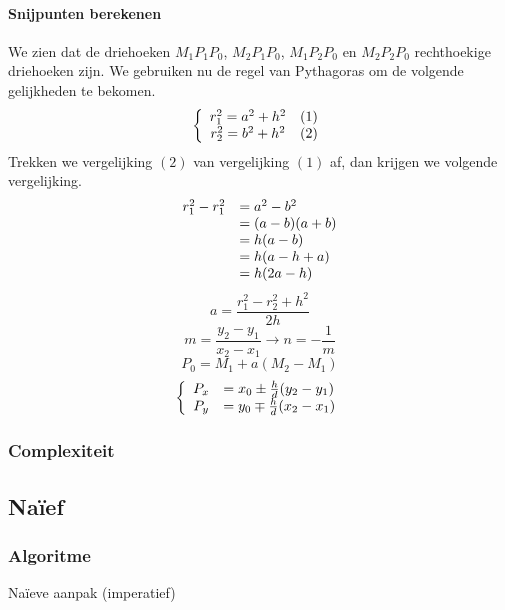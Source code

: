 \paragraph{Snijpunten berekenen}
We zien dat de driehoeken $M_1P_1P_0$, $M_2P_1P_0$, $M_1P_2P_0$ en $M_2P_2P_0$ rechthoekige driehoeken zijn. We gebruiken nu de regel van Pythagoras om de volgende gelijkheden te bekomen.
\[
\left\{
\begin{array}{c l r}
r_1^2 = a^2 + h^2 & (1)\\
r_2^2 = b^2 + h^2 & (2)
\end{array}
\right.
\]
Trekken we vergelijking $(2)$ van vergelijking $(1)$ af, dan krijgen we volgende vergelijking.
\[
\begin{array}{r l}
r_1^2 -r_1^2 & = a^2 - b^2\\
& = (a-b)(a+b)\\
& = h(a-b)\\
& = h(a-h+a)\\
& = h(2a-h)
\end{array}
\]
\[
a = \frac{r_1^2-r_2^2 + h^2}{2h}
\]
\[
m = \frac{y_2-y_1}{x_2-x_1} \rightarrow n = -\frac{1}{m}
\]
\[
P_0 = M_1 + a(M_2-M_1)
\]
\[
\left\{
\begin{array}{c l}
P_x &= x_0 \pm \frac{h}{d}(y_2-y_1)\\
P_y &= y_0 \mp \frac{h}{d}(x_2-x_1)
\end{array}
\right.
\]




\subsubsection{Complexiteit}

\subsection{Na\"ief}
\label{sec:naief}

\subsubsection{Algoritme}

\begin{algorithm}[H]
  \SetAlgoLined
  \caption{Na\"ieve aanpak (imperatief)}
  \label{algo:naive}
\end{algorithm}

